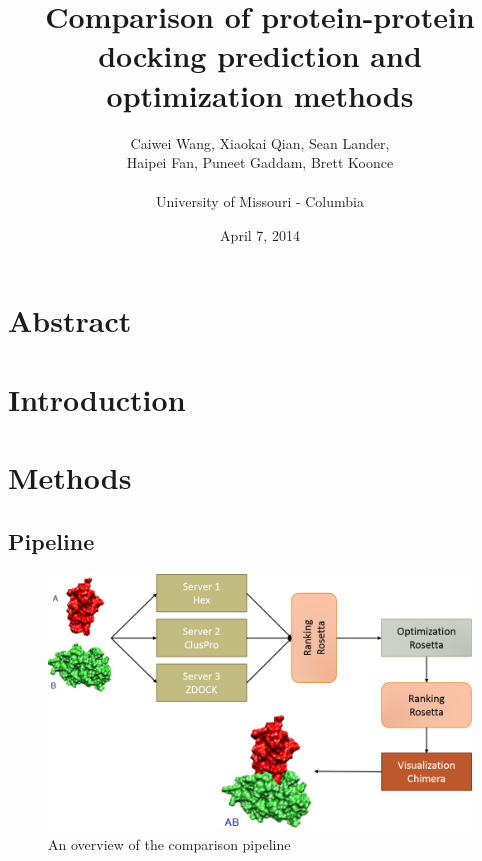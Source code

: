 \documentclass{article}
\title{Comparison of protein-protein docking prediction and optimization methods}
\author{Caiwei Wang, Xiaokai Qian, Sean Lander, \\Haipei Fan, Puneet Gaddam, Brett Koonce\\\\University of Missouri - Columbia}
\date{April 7, 2014}
\begin{document}
\maketitle

\section{Abstract}



\section{Introduction}



\section{Methods}



\subsection{Pipeline}

\begin{figure}[H]
\begin{center}
\includegraphics[width=\textwidth]{pipeline}
\caption{An overview of the comparison pipeline}
\label{Fig:blosum}
\end{center}
\end{figure}
\end{document}
